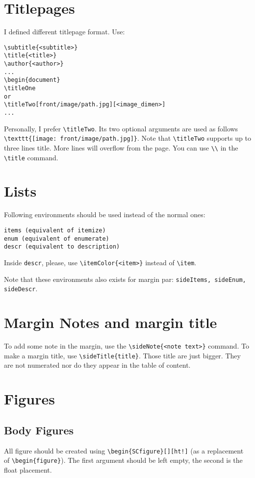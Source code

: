 \documentclass[a4paper, 11pt, oneside, fleqn]{article}
\begin{document}
	\section{Titlepages}
	I defined different titlepage format. Use:
	\begin{lstlisting}
\subtitle{<subtitle>}
\title{<title>}
\author{<author>}
...
\begin{document}
\titleOne
or
\titleTwo[front/image/path.jpg][<image_dimen>]
...
	\end{lstlisting}
	
	Personally, I prefer \lstinline[breaklines]|\titleTwo|. Its two optional arguments are used as follows \lstinline[breaklines]|\texttt{[image: front/image/path.jpg]}|. Note that \lstinline[breaklines]|\titleTwo| supports up to three lines title. More lines will overflow from the page. You can use \lstinline[breaklines]|\\| in the \lstinline[breaklines]|\title| command.
	
	\section{Lists}
	Following environments should be used instead of the normal ones:
	\begin{lstlisting}
items (equivalent of itemize)
enum (equivalent of enumerate)
descr (equivalent to description)
	\end{lstlisting}
	
	Inside \lstinline[breaklines]|descr|, please, use \lstinline[breaklines]|\itemColor{<item>}| instead of \lstinline[breaklines]|\item|.
	
	Note that these environments also exists for margin par: \lstinline[breaklines]|sideItems, sideEnum, sideDescr|.
	
	\section{Margin Notes and margin title}
	To add some note in the margin, use the \lstinline[breaklines]|\sideNote{<note text>}| command. To make a margin title, use \lstinline[breaklines]|\sideTitle{title}|. Those title are just bigger. They are not numerated nor do they appear in the table of content.
	
	
	\section{Figures}
	\subsection{Body Figures}
	All figure should be created using \lstinline[breaklines]|\begin{SCfigure}[][ht!]| (as a replacement of \lstinline[breaklines]|\begin{figure}|). The first argument should be left empty, the second is the float placement.
	
\end{document}

